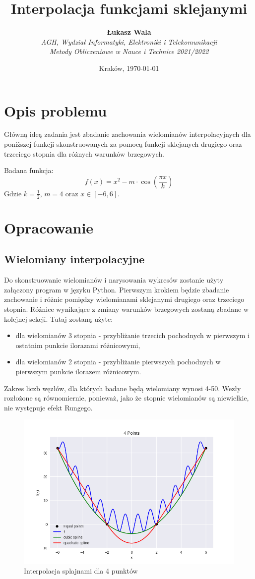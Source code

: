 \documentclass{article}
\title{Interpolacja funkcjami sklejanymi}
\author{\textbf{Łukasz Wala}\\
    \textit{AGH, Wydział Informatyki, Elektroniki i Telekomunikacji} \\
    \textit{Metody Obliczeniowe w Nauce i Technice 2021/2022}}
\date{Kraków, \today}
\begin{document}
\maketitle

\section{Opis problemu}
Główną ideą zadania jest zbadanie zachowania wielomianów interpolacyjnych
dla poniższej funkcji skonstruowanych za pomocą funkcji sklejanych drugiego oraz
trzeciego stopnia dla różnych warunków brzegowych.

Badana funkcja:
\[f(x)=x^2-m\cdot\cos\left(\frac{\pi x}{k}\right)\]
Gdzie $k=\frac{1}{2}$, $m=4$ oraz $x\in [-6,6]$.

\section{Opracowanie}
\subsection{Wielomiany interpolacyjne}
Do skonstruowanie wielomianów i narysowania wykresów zostanie użyty załączony program w języku Python.
Pierwszym krokiem będzie zbadanie zachowanie i różnic pomiędzy wielomianami sklejanymi drugiego oraz trzeciego 
stopnia. Różnice wynikające z zmiany warunków brzegowych zostaną zbadane w kolejnej sekcji. Tutaj zostaną użyte:
\begin{itemize}
    \item
    dla wielomianów 3 stopnia - przybliżanie trzecich pochodnych w pierwszym i ostatnim punkcie ilorazami różnicowymi,
    \item
    dla wielomianów 2 stopnia - przybliżanie pierwszych pochodnych w pierwszym punkcie ilorazem różnicowym.
\end{itemize}

Zakres liczb węzłów, dla których badane będą wielomiany wynosi 4-50. Wezły rozłożone są równomiernie, ponieważ, 
jako że stopnie wielomianów są niewielkie, nie występuje efekt Rungego.

\begin{figure}[H]
    \centering
    \includegraphics[width=\textwidth]{img/spline_4.png}
    \caption{Interpolacja splajnami dla 4 punktów}
\end{figure}
\end{document}
